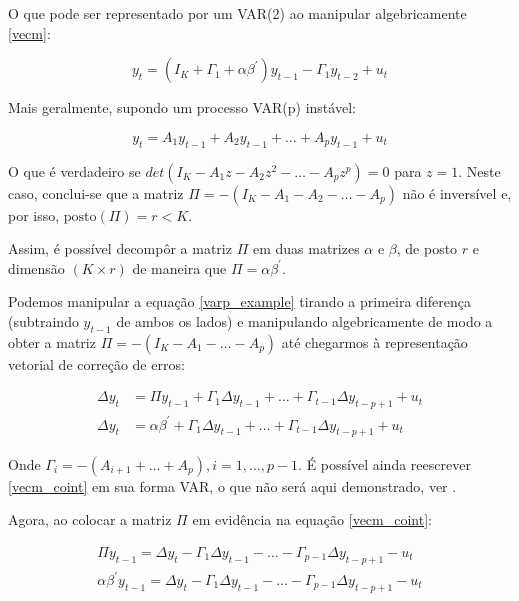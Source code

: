 \documentclass[a4paper,
               article,
               12pt,
               openany,
               oneside,
               english,
               brazil]{abntex2}
\numberwithin{equation}{section}
\begin{document}
    O que pode ser representado por um VAR(2) ao manipular algebricamente \eqref{vecm}:

    \begin{equation}
        \label{vecm-var}
        y_t = (I_K + \Gamma_1 + \alpha \beta^{'})y_{t-1} - \Gamma_1 y_{t-2} + u_t
    \end{equation}

    Mais geralmente, supondo um processo VAR(p) instável:
    
    \begin{equation}
        \label{varp_example}
        y_t = A_1 y_{t-1} + A_2 y_{t-1} + \dots + A_p y_{t-1} + u_t 
    \end{equation}

    O que é verdadeiro se $ det(I_K - A_1z - A_2z^2 - \dots - A_pz^p) = 0 $ para $ z = 1 $. Neste caso, conclui-se que a matriz $ \Pi = -(I_K - A_1 - A_2 - \dots - A_p) $ não é inversível e, por isso, $ \text{posto}(\Pi) = r < K $.
    
    Assim, é possível decompôr a matriz $ \Pi $ em duas matrizes $ \alpha $ e $ \beta $, de posto $ r $ e dimensão $ (K \times r) $ de maneira que $ \Pi = \alpha \beta^{'} $.

   Podemos manipular a equação \eqref{varp_example} tirando a primeira diferença (subtraindo $ y_{t-1} $ de ambos os lados) e manipulando algebricamente de modo a obter a matriz $ \Pi = -(I_K - A_1 - \dots - A_p) $ até chegarmos à representação vetorial de correção de erros:

   \begin{equation}
       \label{vecm_coint}
       \begin{aligned}
           \Delta y_t &= \Pi y_{t-1} + \Gamma_1 \Delta y_{t-1} + \dots + \Gamma_{t-1} \Delta y_{t-p+1} + u_t \\
           \Delta y_t &= \alpha \beta^{'} + \Gamma_1 \Delta y_{t-1} + \dots + \Gamma_{t-1} \Delta y_{t-p+1} + u_t
       \end{aligned}
   \end{equation}

   Onde $ \Gamma_i = -(A_{i+1} + \dots + A_p), i = 1, \dots, p-1 $. É possível ainda reescrever \eqref{vecm_coint} em sua forma VAR, o que não será aqui demonstrado, ver \cite[p.~248-249]{lutkepool}.

   Agora, ao colocar a matriz $ \Pi $ em evidência na equação \eqref{vecm_coint}:

   \begin{equation}
       \label{vecm_coint2}
       \begin{aligned}
       \Pi y_{t-1} = \Delta y_t - \Gamma_1 \Delta y_{t-1} - \dots - \Gamma_{p-1} \Delta y_{t-p+1} - u_t \\
           \alpha \beta^{'} y_{t-1} = \Delta y_t - \Gamma_1 \Delta y_{t-1} - \dots - \Gamma_{p-1} \Delta y_{t-p+1} - u_t
       \end{aligned}
   \end{equation}
\end{document}
